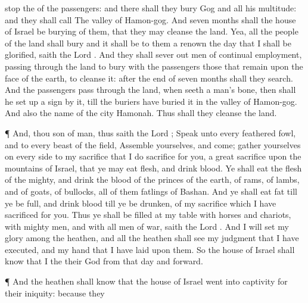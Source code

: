 {stop the
{} of the
passengers: and there shall they
bury
Gog and all his
multitude: and they shall
call
{} The
valley of
Hamon-gog.
And
seven
months shall the
house of
Israel be
burying of them, that they may
cleanse the
land.
Yea, all the
people of the
land shall
bury
{} and it shall be to them a
renown the
day that I shall be
glorified,
saith the
Lord
{}.
And they shall sever
out
men of continual
employment, passing
through the
land to
bury with the
passengers those that
remain upon the
face of the
earth, to
cleanse it: after the
end of
seven
months shall they
search.
And the
passengers
{} pass
through the
land, when
{}
seeth a
man’s
bone, then shall he set
up a
sign
by it, till the
buriers have
buried it in the
valley of
Hamon-gog.
And also the
name of the
city
{}
Hamonah. Thus shall they
cleanse the
land.
\par }{\PP {}¶ And, thou
son of
man, thus
saith the
Lord
{};
Speak unto every
feathered
fowl, and to every
beast of the
field,
Assemble yourselves, and
come;
gather yourselves on every
side to my
sacrifice that I do
sacrifice for you,
{} a
great
sacrifice upon the
mountains of
Israel, that ye may
eat
flesh, and
drink
blood.
Ye shall
eat the
flesh of the
mighty, and
drink the
blood of the
princes of the
earth, of
rams, of
lambs, and of
goats, of
bullocks, all of them
fatlings of
Bashan.
And ye shall
eat
fat till ye be
full, and
drink
blood till ye be
drunken, of my
sacrifice which I have
sacrificed for you.
Thus ye shall be
filled at my
table with
horses and
chariots, with mighty
men, and with all
men of
war,
saith the
Lord
{}.
And I will
set my
glory among the
heathen, and all the
heathen shall
see my
judgment that I have
executed, and my
hand that I have
laid upon them.
So the
house of
Israel shall
know that I
{} the
{} their
God from that
day and
forward.
\par }{\PP {}¶ And the
heathen shall
know that the
house of
Israel went into
captivity for their
iniquity: because they
}
